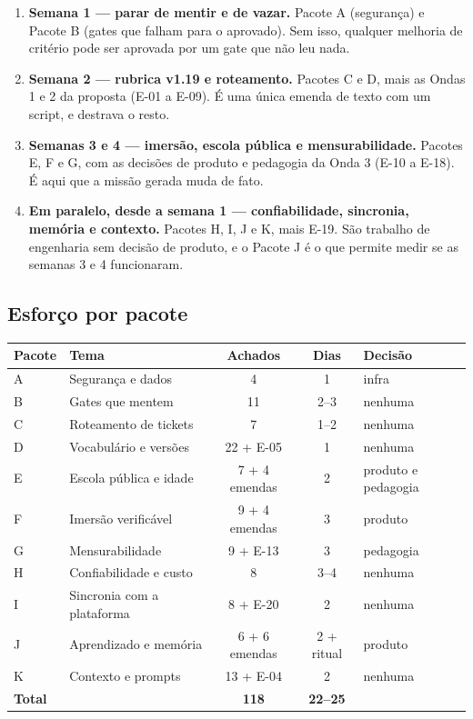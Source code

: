\documentclass[11pt,a4paper]{article}
\begin{document}
\begin{enumerate}
  \item \textbf{Semana 1 --- parar de mentir e de vazar.} Pacote A (segurança) e Pacote B (gates que
        falham para o aprovado). Sem isso, qualquer melhoria de critério pode ser aprovada por um
        gate que não leu nada.
  \item \textbf{Semana 2 --- rubrica v1.19 e roteamento.} Pacotes C e D, mais as Ondas 1 e 2 da
        proposta (E-01 a E-09). É uma única emenda de texto com um script, e destrava o resto.
  \item \textbf{Semanas 3 e 4 --- imersão, escola pública e mensurabilidade.} Pacotes E, F e G, com as
        decisões de produto e pedagogia da Onda 3 (E-10 a E-18). É aqui que a missão gerada muda de
        fato.
  \item \textbf{Em paralelo, desde a semana 1 --- confiabilidade, sincronia, memória e contexto.}
        Pacotes H, I, J e K, mais E-19. São trabalho de engenharia sem decisão de produto, e o
        Pacote J é o que permite medir se as semanas 3 e 4 funcionaram.
\end{enumerate}

\subsection{Esforço por pacote}

\begin{center}\small
\begin{tabular}{@{}l p{5.2cm} c c p{4.2cm}@{}}
\toprule
\textbf{Pacote} & \textbf{Tema} & \textbf{Achados} & \textbf{Dias} & \textbf{Decisão} \\
\midrule
A & Segurança e dados & 4 & 1 & infra \\
B & Gates que mentem & 11 & 2--3 & nenhuma \\
C & Roteamento de tickets & 7 & 1--2 & nenhuma \\
D & Vocabulário e versões & 22 + E-05 & 1 & nenhuma \\
E & Escola pública e idade & 7 + 4 emendas & 2 & produto e pedagogia \\
F & Imersão verificável & 9 + 4 emendas & 3 & produto \\
G & Mensurabilidade & 9 + E-13 & 3 & pedagogia \\
H & Confiabilidade e custo & 8 & 3--4 & nenhuma \\
I & Sincronia com a plataforma & 8 + E-20 & 2 & nenhuma \\
J & Aprendizado e memória & 6 + 6 emendas & 2 + ritual & produto \\
K & Contexto e prompts & 13 + E-04 & 2 & nenhuma \\
\midrule
\textbf{Total} & & \textbf{118} & \textbf{22--25} & \\
\bottomrule
\end{tabular}
\end{center}
\end{document}
